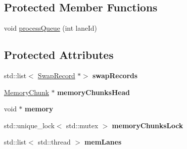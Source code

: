 \subsection*{Protected Member Functions}
\begin{DoxyCompactItemize}
\item 
void \mbox{\hyperlink{classathena_1_1backend_1_1generic_1_1_generic_memory_manager_a978be661a46caaa8f6ef40a2c45a014e}{process\+Queue}} (int lane\+Id)
\end{DoxyCompactItemize}
\subsection*{Protected Attributes}
\begin{DoxyCompactItemize}
\item 
\mbox{\label{classathena_1_1backend_1_1generic_1_1_generic_memory_manager_ad368d5195616a86b69f9f0d052c2aa34}} 
std\+::list$<$ \mbox{\hyperlink{structathena_1_1backend_1_1generic_1_1_swap_record}{Swap\+Record}} $\ast$$>$ {\bfseries swap\+Records}
\item 
\mbox{\label{classathena_1_1backend_1_1generic_1_1_generic_memory_manager_a99f2c7ed16c2eb288cbcd700d09847ae}} 
\mbox{\hyperlink{structathena_1_1backend_1_1generic_1_1_memory_chunk}{Memory\+Chunk}} $\ast$ {\bfseries memory\+Chunks\+Head}
\item 
\mbox{\label{classathena_1_1backend_1_1generic_1_1_generic_memory_manager_a74a52b5bebdd94425f0b8e925a1aca5a}} 
void $\ast$ {\bfseries memory}
\item 
\mbox{\label{classathena_1_1backend_1_1generic_1_1_generic_memory_manager_a64414866090303a2c66e4dcc20e8ca97}} 
std\+::unique\+\_\+lock$<$ std\+::mutex $>$ {\bfseries memory\+Chunks\+Lock}
\item 
\mbox{\label{classathena_1_1backend_1_1generic_1_1_generic_memory_manager_ae684dd8406e07b920618803e94d69769}} 
std\+::list$<$ std\+::thread $>$ {\bfseries mem\+Lanes}
\item 
\mbox{\label{classathena_1_1backend_1_1generic_1_1_generic_memory_manager_aaa877b3145831b8476d2f9e575326295}} 
$$
\end{DoxyCompactItemize}
